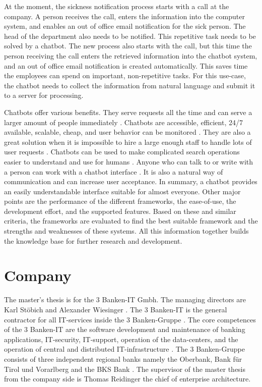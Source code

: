 At the moment, the sickness notification process starts with a call at the company. 
A person receives the call, enters the information into the computer system, and enables an out of office email notification for the sick person. 
The head of the department also needs to be notified. 
This repetitive task needs to be solved by a chatbot. 
The new process also starts with the call, but this time the person receiving the call enters the retrieved information into the chatbot system, and an out of office email notification is created automatically. 
This saves time the employees can spend on important, non-repetitive tasks.
For this use-case, the chatbot needs to collect the information from natural language and submit it to a server for processing.

Chatbots offer various benefits.
They serve requests all the time and can serve a larger amount of people immediately \cite{kane2016role}.
Chatbots are accessible, efficient, 24/7 available, scalable, cheap, and user behavior can be monitored \cite{buiildChatbotsPython}.
They are also a great solution when it is impossible to hire a large enough staff to handle lots of user requests \cite{kane2016role}.
Chatbots can be used to make complicated search operations easier to understand and use for humans \cite{kane2016role}.
Anyone who can talk to or write with a person can work with a chatbot interface \cite{buiildChatbotsPython}.
It is also a natural way of communication and can increase user acceptance.
In summary, a chatbot provides an easily understandable interface suitable for almost everyone.
Other major points are the performance of the different frameworks, the ease-of-use, the development effort, and the supported features.
Based on these and similar criteria, the frameworks are evaluated to find the best suitable framework and the strengths and weaknesses of these systems.
All this information together builds the knowledge base for further research and development.

\section{Company}
The master's thesis is for the 3 Banken-IT Gmbh. The managing directors are Karl St\"obich and Alexander Wiesinger \cite{3bitorgani}. 
The 3 Banken-IT is the general contractor for all IT-services inside the 3 Banken-Gruppe \cite{3bitservices}. 
The core competences of the 3 Banken-IT are the software development and maintenance of banking applications, IT-security, 
IT-support, operation of the data-centers, and the operation of central and distributed IT-infrastructure \cite{3bitservices}. 
The 3 Banken-Gruppe consists of three independent regional banks namely the Oberbank, Bank für Tirol und Vorarlberg and the BKS Bank \cite{3bitcompany}. 
The supervisor of the master thesis from the company side is Thomas Reidinger the chief of enterprise architecture.

